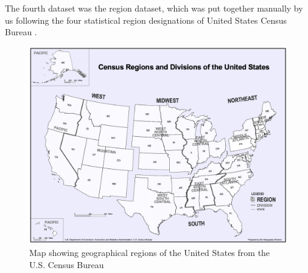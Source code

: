 \documentclass[12pt]{article}
\newcommand{\blue}[1]{\textcolor{blue}{#1}}
\begin{document}


The fourth dataset was the region dataset, which was put together manually by us following the four statistical region designations of United States Census Bureau \parencite{regions}. 

\begin{figure}[!h]
	\includegraphics[width =\linewidth]{figures/us_region_map.png}
	
	\caption{Map showing geographical regions of the United States from the U.S. Census Bureau \parencite{regions}}
	\label{regionmap}
\end{figure}
\end{document}
